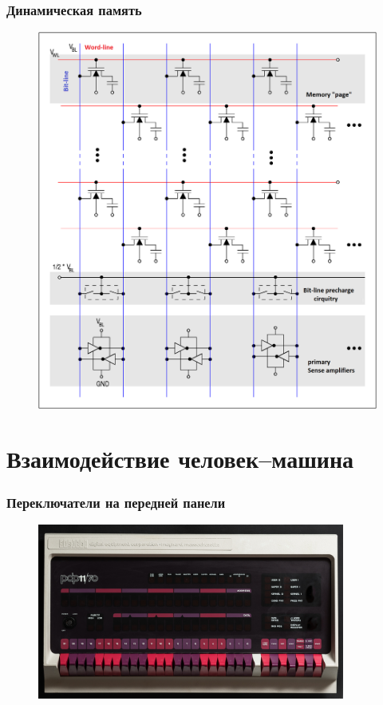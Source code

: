 \documentclass[t,aspectratio=169]{beamer}
\begin{document}
\begin{frame}
    \frametitle{Динамическая память}
    \begin{figure}
        \begin{centering}
            \includegraphics[height=0.8\textheight]{dram}
        \end{centering}
    \end{figure}
\end{frame}

\section{Взаимодействие человек--машина}
\begin{frame}
    \frametitle{Переключатели на передней панели}
    \begin{figure}
        \begin{centering}
            \includegraphics[width=0.9\textwidth]{pdp1170-fp}
        \end{centering}
    \end{figure}
\end{frame}
\end{document}
